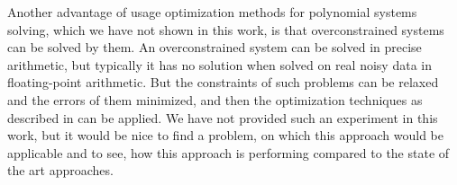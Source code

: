Another advantage of usage optimization methods for polynomial systems solving, which we have not shown in this work, is that overconstrained systems can be solved by them.
An overconstrained system can be solved in precise arithmetic, but typically it has no solution when solved on real noisy data in floating-point arithmetic.
But the constraints of such problems can be relaxed and the errors of them minimized, and then the optimization techniques as described in  can be applied.
We have not provided such an experiment in this work, but it would be nice to find a problem, on which this approach would be applicable and to see, how this approach is performing compared to the state of the art approaches.
